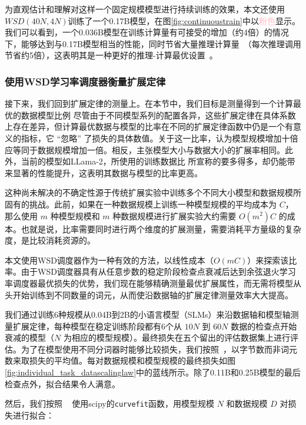 为直观估计和理解对这样一个固定规模模型进行持续训练的效果，本文还使用$WSD(40N, 4N)$训练了一个0.17B模型，在图\ref{fig:continuoustrain}中以\textcolor{pink}{粉色}显示。我们可以看到，一个0.036B模型在训练计算量有可接受的增加（约4倍）的情况下，能够达到与0.17B模型相当的性能，同时节省大量推理计算量~\citep{sardana2023beyond}（每次推理调用节省约5倍），这表明其是一种更好的推理-计算最优设置~\citep{sardana2023beyond}。 


\subsubsection{使用WSD学习率调度器衡量扩展定律}
\label{scalinglawwsdlrs}
接下来，我们回到扩展定律的测量上。在本节中，我们目标是测量得到一个计算最优的数据模型比例 尽管由于不同模型系列的配置各异，这些扩展定律在具体系数上存在差异，但计算最优数据与模型的比率在不同的扩展定律函数中仍是一个有意义的指标，它 “忽略” 了损失的具体数值。关于这一比率，\citet{kaplan2020scaling}认为模型规模增加十倍应等同于数据规模增加一倍。相反，\citet{hoffmann2022training}主张模型大小与数据大小的扩展率相同。此外，当前的模型如LLama-2\cite{touvron2023llama}，所使用的训练数据比 \citet{hoffmann2022training} 所宣称的要多得多，却仍能带来显著的性能提升，这表明其数据与模型的比率更高。

这种尚未解决的不确定性源于传统扩展实验中训练多个不同大小模型和数据规模所固有的挑战。此前，如果在一种数据规模上训练一种模型规模的平均成本为 $C$，那么使用 $m$ 种模型规模和 $m$ 种数据规模进行扩展实验大约需要 $O(m^2)C$ 的成本。也就是说，比率需要同时进行两个维度的扩展测量，需要消耗平方量级的复杂度，是比较消耗资源的。

本文使用WSD调度器作为一种有效的方法，以线性成本（$O(mC)$）来探索该比率。由于WSD调度器具有从任意步数的稳定阶段检查点衰减后达到余弦退火学习率调度器最优损失的优势，我们现在能够精确测量最优扩展属性，而无需将模型从头开始训练到不同数量的词元，从而使沿数据轴的扩展定律测量效率大大提高。

我们通过训练6种规模从0.04B到2B的小语言模型（SLMs）来沿数据轴和模型轴测量扩展定律，每种模型在稳定训练阶段都有6个从 $10N$ 到 $60N$ 数据的检查点开始衰减的模型（$N$ 为相应的模型规模）。最终损失在五个留出的评估数据集上进行评估。为了在模型使用不同分词器时能够比较损失，我们按照~\cite{achiam2023gpt}，以字节数而非词元数来取损失的平均值。每对数据规模和模型规模的最终损失如图\ref{fig:individual_task_datascalinglaw}中的蓝线所示。除了0.11B和0.25B模型的最后检查点外，拟合结果令人满意。 

然后，我们按照 ~\cite{hoffmann2022training} 使用scipy的\texttt{curvefit}函数，用模型规模 $N$ 和数据规模 $D$ 对损失进行拟合：

